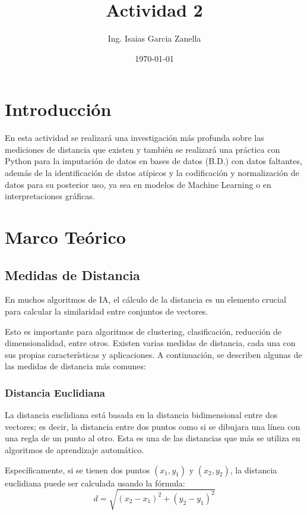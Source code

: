 \documentclass[12pt]{article}
\title{Actividad 2}
\author{Ing. Isaias Garcia Zanella}
\date{\today}
\begin{document}
\maketitle

\section{Introducción}
En esta actividad se realizará una investigación más profunda sobre las 
mediciones de distancia que existen y también se realizará una práctica con Python para la imputación de datos en bases de datos (B.D.) con datos faltantes, 
además de la identificación de datos atípicos y la codificación y normalización de datos para su posterior uso, ya sea en modelos de Machine Learning o en interpretaciones gráficas.

\section{Marco Teórico}
\subsection{Medidas de Distancia}
En muchos algoritmos de IA, el cálculo de la distancia es un elemento
crucial para calcular la similaridad entre conjuntos de vectores.~\cite{De0a100enIA}

Esto es importante para algoritmos de clustering, clasificación, reducción de dimensionalidad, entre otros.
Existen varias medidas de distancia, cada una con sus propias características y aplicaciones. A continuación, se describen algunas de las medidas de distancia más comunes:

\subsubsection{Distancia Euclidiana}
La distancia euclidiana está basada en la distancia bidimensional entre dos vectores; es decir, la 
distancia entre dos puntos como si se dibujara una línea con una regla de un punto al otro. Esta es una de las distancias que
más se utiliza en algoritmos de aprendizaje automático.

Específicamente, si se tienen dos puntos $(x_1, y_1)$ y $(x_2, y_2)$, la distancia euclidiana puede ser calculada usando la fórmula:
\begin{equation}
d = \sqrt{(x_2 - x_1)^2 + (y_2 - y_1)^2}
\end{equation}
~\cite{De0a100enIA}
\end{document}
